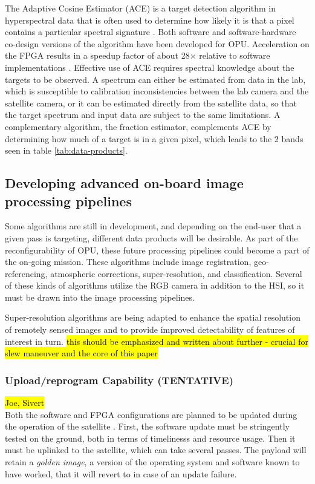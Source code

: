 The Adaptive Cosine Estimator (ACE) is a target detection algorithm in hyperspectral data that is often used to determine how likely it is that a pixel contains a particular spectral signature \cite{Manolakis2002, Manolakis2005}.
Both software and software-hardware co-design versions of the algorithm have been developed for OPU. 
Acceleration on the FPGA results in a speedup factor of about 28$\times$ relative to software implementations \cite{dijehw19_meco}. 
Effective use of ACE requires spectral knowledge about the targets to be observed. 
A spectrum can either be estimated from data in the lab, which is susceptible to calibration inconsistencies between the lab camera and the satellite camera, or it can be estimated directly from the satellite data, so that the target spectrum and input data are subject to the same limitations. 
A complementary algorithm, the fraction estimator, complements ACE by determining how much of a target is in a given pixel, which leads to the 2 bands seen in table \ref{tab:data-products}. 

\subsection{Developing advanced on-board image processing pipelines}

Some algorithms are still in development, and depending on the end-user that a given pass is targeting, different data products will be desirable.
As part of the reconfigurability of OPU, these future processing pipelines could become a part of the on-going mission. 
These algorithms include image registration, geo-referencing, atmospheric corrections, super-resolution, and classification. 
Several of these kinds of algorithms utilize the RGB camera in addition to the HSI, so it must be drawn into the image processing pipelines. 

Super-resolution algorithms are being adapted to enhance the spatial resolution of remotely sensed images \cite{Park2003, Garrett2019} and to provide improved detectability of features of interest in turn. \hl{this should be emphasized and written about further - crucial for slew maneuver and the core of this paper}


\subsubsection{Upload/reprogram Capability (TENTATIVE)}
\hl{Joe, Sivert \\}
Both the software and FPGA configurations are planned to be updated during the operation of the satellite \cite{Gjersund2020}. First, the software update must be stringently tested on the ground, both in terms of timelinesss and resource usage. Then it must be uplinked to the satellite, which can take several passes. The payload will retain a \textit{golden image}, a version of the operating system and software known to have worked, that it will revert to in case of an update failure. 

